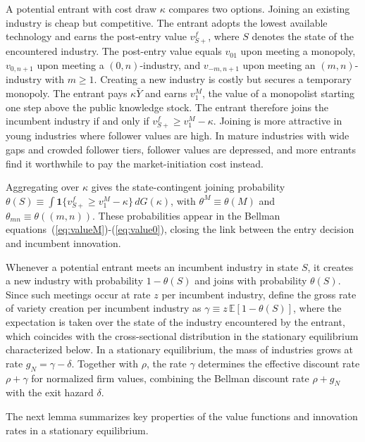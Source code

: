 \documentclass[12pt]{article}
\begin{document}
A potential entrant with cost draw \(\kappa\) compares two options. Joining an existing industry is cheap but competitive. The entrant adopts the lowest available technology and earns the post-entry value \(v^f_{S+}\), where \(S\) denotes the state of the encountered industry. The post-entry value equals \(v_{01}\) upon meeting a monopoly, \(v_{0,n+1}\) upon meeting a \((0,n)\)-industry, and \(v_{-m,n+1}\) upon meeting an \((m,n)\)-industry with \(m\geq1\). Creating a new industry is costly but secures a temporary monopoly. The entrant pays \(\kappa\bar Y\) and earns \(v^M_1\), the value of a monopolist starting one step above the public knowledge stock. The entrant therefore joins the incumbent industry if and only if \(v^f_{S+}\geq v^M_1-\kappa\). Joining is more attractive in young industries where follower values are high. In mature industries with wide gaps and crowded follower tiers, follower values are depressed, and more entrants find it worthwhile to pay the market-initiation cost instead.

Aggregating over \(\kappa\) gives the state-contingent joining probability \(\theta(S)\equiv\int\mathbf{1}\{v^f_{S+}\geq v^M_1-\kappa\}\,dG(\kappa)\), with \(\theta^M\equiv\theta(M)\) and \(\theta_{mn}\equiv\theta((m,n))\). These probabilities appear in the Bellman equations~(\ref{eq:valueM})-(\ref{eq:value0}), closing the link between the entry decision and incumbent innovation.

Whenever a potential entrant meets an incumbent industry in state \(S\), it creates a new industry with probability \(1-\theta(S)\) and joins with probability \(\theta(S)\). Since such meetings occur at rate \(z\) per incumbent industry, define the gross rate of variety creation per incumbent industry as \(\gamma \equiv z\,\mathbb{E}[1-\theta(S)]\), where the expectation is taken over the state of the industry encountered by the entrant, which coincides with the cross-sectional distribution in the stationary equilibrium characterized below. In a stationary equilibrium, the mass of industries grows at rate \(g_N = \gamma - \delta\). Together with \(\rho\), the rate \(\gamma\) determines the effective discount rate \(\rho+\gamma\) for normalized firm values, combining the Bellman discount rate \(\rho+g_N\) with the exit hazard \(\delta\).

\bigskip

The next lemma summarizes key properties of the value functions and innovation rates in a stationary equilibrium.
\end{document}

